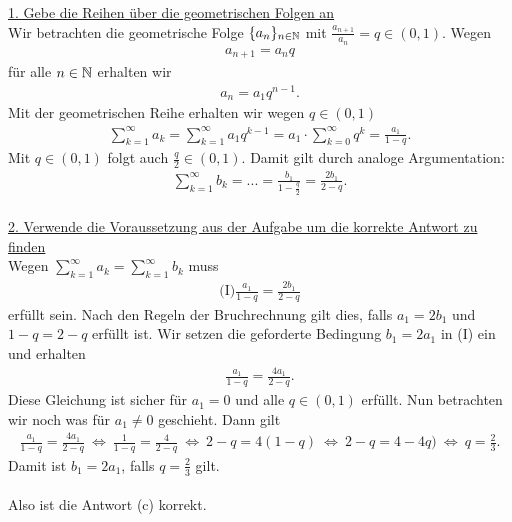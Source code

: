 \underline{1. Gebe die Reihen über die geometrischen Folgen an}\\
Wir betrachten die geometrische Folge $ \{ a_n \}_{n \in \mathbb{N}} $ mit $ \frac{a_{n+1}}{a_n} = q \in (0,1) $.
Wegen 
\begin{align*}
	a_{n+1} = a_n q
\end{align*}
für alle $ n \in \mathbb{N} $ erhalten wir
\begin{align*}
	a_{n} = a_1 q^{n-1}.
\end{align*}
Mit der geometrischen Reihe erhalten wir wegen $ q \in (0,1) $
\begin{align*}
	\sum \limits_{k = 1}^\infty a_k 
	=
	\sum \limits_{k = 1}^\infty a_1 q^{k-1}
	=
	a_1 \cdot  \sum \limits_{k = 0}^\infty q^k
	= 
	\frac{a_1}{1-q}.
\end{align*}
Mit $ q \in (0,1)  $ folgt auch $ \frac{q}{2} \in (0,1)  $.
Damit gilt durch analoge Argumentation:
\begin{align*}
	\sum \limits_{k = 1}^\infty b_k = ...=
	\frac{b_1}{1- \frac{q}{2}}
	=
	\frac{2b_1}{2  -q}.
\end{align*}
\ \\
\underline{2. Verwende die Voraussetzung aus der Aufgabe um die korrekte Antwort zu finden}\\
Wegen $ \sum_{k = 1}^\infty a_k = \sum_{k = 1}^\infty b_k $ muss 
\begin{align*}
\textrm{(I)}	\frac{a_1}{1-q} = \frac{2b_1}{2  -q}
\end{align*}
erfüllt sein.
Nach den Regeln der Bruchrechnung gilt dies, falls $ a_1 = 2 b_1 $ und $ 1- q = 2 - q $ erfüllt ist.
Wir setzen die geforderte Bedingung $ b_1 = 2 a_1 $ in (I) ein und erhalten
\begin{align*}
	\frac{a_1}{1- q} =\frac{4 a_1}{2- q}.
\end{align*}
Diese Gleichung ist sicher für $ a_1 = 0 $ und alle $ q \in (0,1) $ erfüllt.
Nun betrachten wir noch was für $ a_1 \neq 0 $ geschieht.
Dann gilt
\begin{align*}
	\frac{a_1}{1- q} =\frac{4 a_1}{2- q}
	\ \Leftrightarrow \
	\frac{1}{1- q} =\frac{4}{2- q}
	\ \Leftrightarrow \
	2 - q = 4 (1-q)
	\ \Leftrightarrow \
	2 - q = 4 - 4 q)
	\ \Leftrightarrow \
	q  =\frac{2}{3}.
\end{align*}
Damit ist $ b_1 = 2 a_1 $, falls $ q = \frac{2}{3} $ gilt.\\
\\
Also ist die Antwort (c) korrekt.

\newpage
